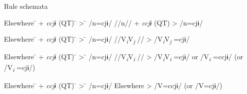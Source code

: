 \begin{xlist}
\ea\label{ex:10.59}   Rule schemata\\
  \ea 
  \begin{tabbing}
  Elsewhere \hspace{\tabcolsep}\=\hspace{\tabcolsep} +  \textit{ccjɨ} (QT) \hspace{\tabcolsep}\=\hspace{\tabcolsep} > \hspace{\tabcolsep}\=\hspace{\tabcolsep} /n=cjɨ/\kill
  //n// \> + \textit{ccjɨ} (QT) \> > \> /n=cjɨ/
  \end{tabbing}
  \ex  \begin{tabbing}
  Elsewhere \hspace{\tabcolsep}\=\hspace{\tabcolsep} +  \textit{ccjɨ} (QT) \hspace{\tabcolsep}\=\hspace{\tabcolsep} > \hspace{\tabcolsep}\=\hspace{\tabcolsep} /n=cjɨ/\kill
  //V\textit{\textsubscript{i}}V\textit{\textsubscript{j} }//  \>   \> > \> /V\textit{\textsubscript{i}}V\textit{\textsubscript{j} }=cjɨ/
  \end{tabbing}
  \ex \begin{tabbing}
  Elsewhere \hspace{\tabcolsep}\=\hspace{\tabcolsep} +  \textit{ccjɨ} (QT) \hspace{\tabcolsep}\=\hspace{\tabcolsep} > \hspace{\tabcolsep}\=\hspace{\tabcolsep} /n=cjɨ/\kill
  //V\textit{\textsubscript{i}}V\textit{\textsubscript{i} }// \> \>     > \> /V\textit{\textsubscript{i}}V\textit{\textsubscript{i} }=cjɨ/ or /V\textit{\textsubscript{i} }=ccjɨ/ (or /V\textit{\textsubscript{i} }=cjɨ/)
  \end{tabbing}
  \ex \begin{tabbing}
  Elsewhere \hspace{\tabcolsep}\=\hspace{\tabcolsep} +  \textit{ccjɨ} (QT) \hspace{\tabcolsep}\=\hspace{\tabcolsep} > \hspace{\tabcolsep}\=\hspace{\tabcolsep} /n=cjɨ/\kill
  Elsewhere    \> \>  > \>  /V=ccjɨ/ (or /V=cjɨ/)
  \end{tabbing}
\z
\z


\end{xlist}
